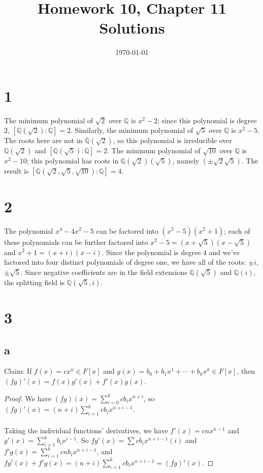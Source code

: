 \documentclass{article}
\title{\textbf{Homework 10, Chapter 11 Solutions}}
\date{}
\date\today
\begin{document}
\maketitle %

\thispagestyle{firstpage}
\section*{1}

The minimum polynomial of $\sqrt{2}$ over $\mathbb{Q}$ is $x^2 - 2$; since this polynomial 
is degree $2$,  $[\mathbb{Q}(\sqrt{2}):\mathbb{Q}] = 2$.  
Similarly, the minimum polynomial of 
$\sqrt{5}$ over $\mathbb{Q}$ is $x^2 - 5$.  The roots here are not in $\mathbb{Q}(\sqrt{2})$, 
so this polynomial is irreducible over $\mathbb{Q}(\sqrt{2})$ and 
$[\mathbb{Q}(\sqrt{5}):\mathbb{Q}] = 2$.  The minimum polynomial of $\sqrt{10}$ 
over $\mathbb{Q}$ is $x^2 - 10$; this polynomial has roots in $\mathbb{Q}(\sqrt{2})(\sqrt{5})$, 
namely $(\pm \sqrt{2} \sqrt{5})$.  The result is  
$[\mathbb{Q}(\sqrt{2}, \sqrt{5}, \sqrt{10}):\mathbb{Q}] = 4$. 


\section*{2} 
The polynomial $x^4 - 4x^2 - 5$ can be factored into $(x^2 - 5)(x^2 + 1)$; 
each of these polynomials can be further factored into $x^2 - 5 = (x + \sqrt{5})(x - \sqrt{5})$ 
and $x^2 + 1 = (x + i)(x - i)$.  Since the polynomial is degree $4$ and 
we've factored into four distinct polynomials of degree one, we have all of the roots: 
$\pm i$, $\pm \sqrt{5}$.  Since negative coefficients are in the field extensions
$\mathbb{Q}(\sqrt{5})$ and $\mathbb{Q}(i)$, the splitting field is $\mathbb{Q}(\sqrt{5}, i)$.

\section*{3}
\subsection*{a}
Claim: If $f(x) = cx^n \in F[x]$ and $g(x) = b_0 + b_1x^1 + \cdots + b_k x^k \in F[x]$, 
then $(fg)' (x) = f(x)g'(x) + f'(x)g(x)$.

\begin{proof}
    We have $(fg)(x) = \sum _{i=0} ^k cb_ix^{n+i}$, so 
    $(fg)'(x) = (n+i)\sum_{i=1} ^k cb_i x^{n+i-1}$.  \\ 
    \\ 
    Taking the individual functions' derivatives, we have 
    $f'(x) = cnx^{n-1}$ and $g'(x) = \sum_{i=1} ^k b_ix^{i-1}$.  So 
    $fg'(x) = \sum cb_i x^{n+i-1}(i)$ and $f'g(x) = \sum_{i=1}^k cnb_ix^{n+i-1}$, and 
    $fg'(x) + f'g(x) = (n+i)\sum_{i=1} ^k cb_i x^{n+i-1} = (fg)'(x)$.
\end{proof}
\end{document}
